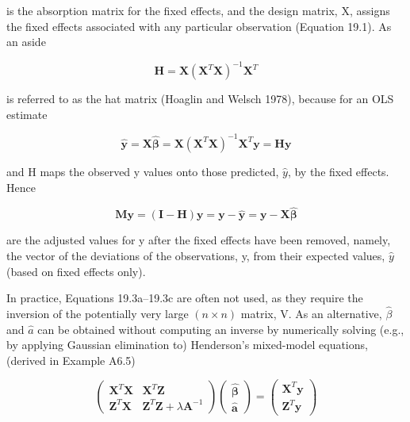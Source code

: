 \documentclass{article}
\begin{document}
is the absorption matrix for the fixed effects, and the design matrix, X, assigns the fixed effects associated with any particular observation (Equation 19.1). As an aside

\begin{equation}
\mathbf{H}=\mathbf{X}\left(\mathbf{X}^{T}\mathbf{X}\right)^{-1}\mathbf{X}^{T}
\tag{19.3e}
\label{eq:19_3e}
\end{equation}

is referred to as the hat matrix (Hoaglin and Welsch 1978), because for an OLS estimate

\begin{equation}
\hat{\mathbf{y}}=\mathbf{X}\hat{\boldsymbol{\beta}}=\mathbf{X}\left(\mathbf{X}^{T}\mathbf{X}\right)^{-1}\mathbf{X}^{T}\mathbf{y}=\mathbf{H}\mathbf{y}
\tag{19.3f}
\label{eq:19_3f}
\end{equation}

and H maps the observed y values onto those predicted,  $ \hat{y} $, by the fixed effects. Hence

\begin{equation}
\mathbf{M}\mathbf{y}=(\mathbf{I}-\mathbf{H})\mathbf{y}=\mathbf{y}-\widehat{\mathbf{y}}=\mathbf{y}-\mathbf{X}\widehat{\boldsymbol{\beta}}
\tag{19.3g}
\label{eq:19_3g}
\end{equation}

are the adjusted values for y after the fixed effects have been removed, namely, the vector of the deviations of the observations, y, from their expected values,  $ \hat{y} $ (based on fixed effects only).

In practice, Equations 19.3a–19.3c are often not used, as they require the inversion of the potentially very large  $ (n \times n) $ matrix, V. As an alternative,  $ \widehat{\beta} $ and  $ \widehat{a} $ can be obtained without computing an inverse by numerically solving (e.g., by applying Gaussian elimination to) Henderson's mixed-model equations, (derived in Example A6.5)

\begin{equation}
\begin{pmatrix}\mathbf{X}^{T}\mathbf{X}&\mathbf{X}^{T}\mathbf{Z}\\\mathbf{Z}^{T}\mathbf{X}&\mathbf{Z}^{T}\mathbf{Z}+\lambda\mathbf{A}^{-1}\end{pmatrix}\begin{pmatrix}\widehat{\boldsymbol{\beta}}\\\widehat{\mathbf{a}}\end{pmatrix}=\begin{pmatrix}\mathbf{X}^{T}\mathbf{y}\\\mathbf{Z}^{T}\mathbf{y}\end{pmatrix}
\tag{19.4}
\label{eq:19_4}
\end{equation}
\end{document}
